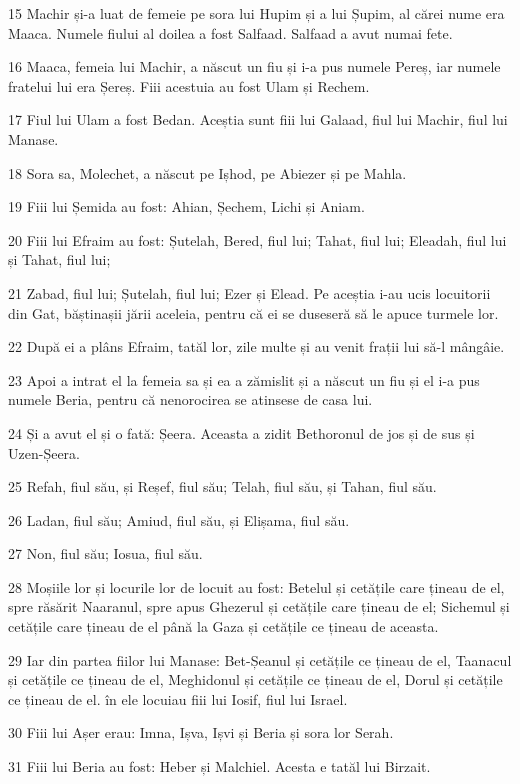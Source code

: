 \par 15 Machir și-a luat de femeie pe sora lui Hupim și a lui Șupim, al cărei nume era Maaca. Numele fiului al doilea a fost Salfaad. Salfaad a avut numai fete.
\par 16 Maaca, femeia lui Machir, a născut un fiu și i-a pus numele Pereș, iar numele fratelui lui era Șereș. Fiii acestuia au fost Ulam și Rechem.
\par 17 Fiul lui Ulam a fost Bedan. Aceștia sunt fiii lui Galaad, fiul lui Machir, fiul lui Manase.
\par 18 Sora sa, Molechet, a născut pe Ișhod, pe Abiezer și pe Mahla.
\par 19 Fiii lui Șemida au fost: Ahian, Șechem, Lichi și Aniam.
\par 20 Fiii lui Efraim au fost: Șutelah, Bered, fiul lui; Tahat, fiul lui; Eleadah, fiul lui și Tahat, fiul lui;
\par 21 Zabad, fiul lui; Șutelah, fiul lui; Ezer și Elead. Pe aceștia i-au ucis locuitorii din Gat, băștinașii jării aceleia, pentru că ei se duseseră să le apuce turmele lor.
\par 22 După ei a plâns Efraim, tatăl lor, zile multe și au venit frații lui să-l mângâie.
\par 23 Apoi a intrat el la femeia sa și ea a zămislit și a născut un fiu și el i-a pus numele Beria, pentru că nenorocirea se atinsese de casa lui.
\par 24 Și a avut el și o fată: Șeera. Aceasta a zidit Bethoronul de jos și de sus și Uzen-Șeera.
\par 25 Refah, fiul său, și Reșef, fiul său; Telah, fiul său, și Tahan, fiul său.
\par 26 Ladan, fiul său; Amiud, fiul său, și Elișama, fiul său.
\par 27 Non, fiul său; Iosua, fiul său.
\par 28 Moșiile lor și locurile lor de locuit au fost: Betelul și cetățile care țineau de el, spre răsărit Naaranul, spre apus Ghezerul și cetățile care țineau de el; Sichemul și cetățile care țineau de el până la Gaza și cetățile ce țineau de aceasta.
\par 29 Iar din partea fiilor lui Manase: Bet-Șeanul și cetățile ce țineau de el, Taanacul și cetățile ce țineau de el, Meghidonul și cetățile ce țineau de el, Dorul și cetățile ce țineau de el. în ele locuiau fiii lui Iosif, fiul lui Israel.
\par 30 Fiii lui Așer erau: Imna, Ișva, Ișvi și Beria și sora lor Serah.
\par 31 Fiii lui Beria au fost: Heber și Malchiel. Acesta e tatăl lui Birzait.

